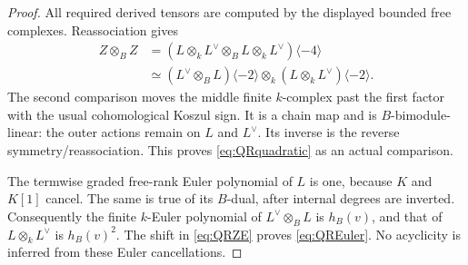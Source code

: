 \begin{proof}
All required derived tensors are computed by the
displayed bounded free complexes. Reassociation gives
\[
\begin{split}
 Z\otimes_B Z
 &=(L\otimes_k L^\vee\otimes_B L\otimes_k L^\vee)
       \langle-4\rangle\\
 &\simeq (L^\vee\otimes_B L)\langle-2\rangle
       \otimes_k(L\otimes_k L^\vee)\langle-2\rangle.
\end{split}
\]
The second comparison moves the middle finite
\(k\)-complex past the first factor with the usual
cohomological Koszul sign. It is a chain map and
is \(B\)-bimodule-linear: the outer actions remain
on \(L\) and \(L^\vee\). Its inverse is the reverse
symmetry/reassociation. This proves
\eqref{eq:QRquadratic} as an actual comparison.

The termwise graded free-rank Euler polynomial of
\(L\) is one, because \(K\) and \(K[1]\) cancel.
The same is true of its \(B\)-dual, after internal
degrees are inverted. Consequently the finite
\(k\)-Euler polynomial of \(L^\vee\otimes_B L\)
is \(h_B(v)\), and that of \(L\otimes_k L^\vee\)
is \(h_B(v)^2\). The shift in \eqref{eq:QRZE}
proves \eqref{eq:QREuler}. No acyclicity is inferred
from these Euler cancellations.


\end{proof}
